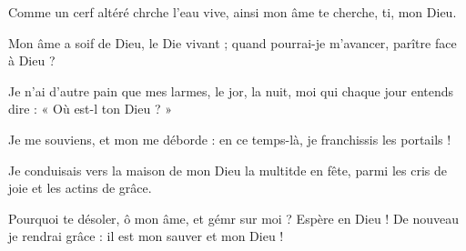 \item Comme un cerf altéré chrche l’eau vive,\psstar{} ainsi mon âme te cherche, ti, mon Dieu.
\item Mon âme a soif de Dieu, le Die vivant ;\psstar{} quand pourrai-je m’avancer, parître face à Dieu ?
\item Je n’ai d’autre pain que mes larmes, le jor, la nuit,\psstar{} moi qui chaque jour entends dire : « Où est-l ton Dieu ? »
\item Je me souviens, et mon me déborde :\psstar{} en ce temps-là, je franchissis les portails ! 
\item Je conduisais vers la maison de mon Dieu la multitde en fête,\psstar{} parmi les cris de joie et les actins de grâce.
\item Pourquoi te désoler, ô mon âme, et gémr sur moi ?\psstar{} Espère en Dieu ! De nouveau je rendrai grâce : il est mon sauver et mon Dieu !